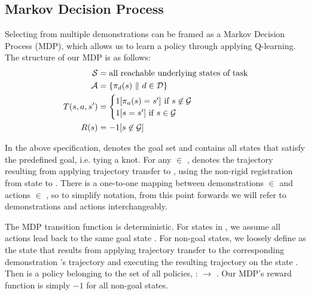 \subsection{Markov Decision Process}
Selecting from multiple demonstrations can be framed as a Markov Decision
Process (MDP), which allows us to learn a policy through applying Q-learning. The structure of our MDP is as follows:
\begin{equation}\label{eq:mdp}
\begin{aligned}
\stateset{} &=  \text{all reachable underlying states of task} \\
\actionset{} &= \{\policysub{\demovar{}}{\statevar{}}\ \| \text{ } \demovar{} \in \demoset{}\} \\
\transitionfn{}(\statevar{}, \actionvar{}, \nextstatevar{}) &=
    \begin{cases}
    1[\policysub{\actionvar{}}{\statevar{}} = \nextstatevar{}] \text{ if } \statevar{} \not \in \goalset{} \\
    1[\statevar{} = \statevar{}'] \text{ if } \statevar{} \in \goalset{}
    \end{cases}\\
\rewardfn{}(\statevar{}) &= -1 {[ \statevar{} \not \in \goalset{} ]} \\
\end{aligned}
\end{equation}

In the above specification, \goalset{} denotes the goal set and contains all
states that satisfy the predefined goal, i.e. tying a knot.
For any \demovar{} $\in$ \demoset{},  denotes the trajectory
resulting from applying trajectory transfer to , using
the non-rigid registration from state  to \statevar{}.
There is a one-to-one mapping between demonstrations \demovar{}
$\in$ \demoset{} and actions \actionvar{} $\in$ \actionset{}, so to simplify
notation, from this point forwards we will refer to demonstrations and
actions interchangeably.

The MDP transition function \transitionfn{} is deterministic. For states
\statevar{} in \goalset{}, we assume all actions lead back to the same
goal state \statevar{}. For
non-goal states, we loosely define \policysub{\actionvar}{\statevar{}}
as the state that results from applying trajectory transfer to the corresponding
demonstration \demovar{}'s trajectory and executing the resulting trajectory
on the state \statevar{}. Then \policysub{\actionvar{}}{\statevar{}} is a
policy belonging to the set of all policies, \policyset{} : \transitionfn{}
 \stateset{} $\rightarrow$ \stateset{}. Our MDP's reward function is
simply $-1$ for all non-goal states.

